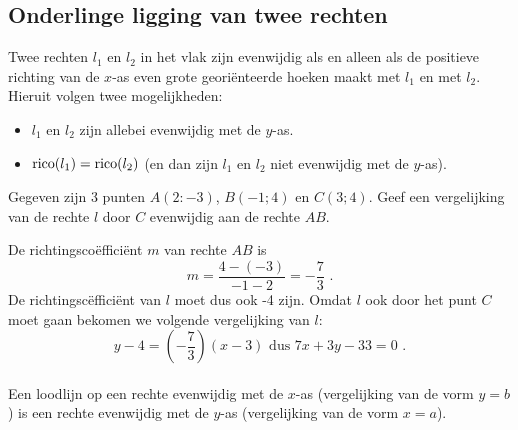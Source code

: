 \subsection{Onderlinge ligging van twee rechten}
\noindent

Twee rechten $l_1$ en $l_2$ in het vlak zijn evenwijdig als en alleen als de positieve richting van de $x$-as even grote geori\"enteerde hoeken maakt met $l_1$ en met $l_2$.
Hieruit volgen twee mogelijkheden:
\begin{itemize}
\item $l_1$ en $l_2$ zijn allebei evenwijdig met de $y$-as.
\item $\operatorname{rico} (l_1)=\operatorname{rico} (l_2)$ (en dan zijn $l_1$ en $l_2$ niet evenwijdig met de $y$-as).
\end{itemize}



\begin{voorbeeld}
Gegeven zijn 3 punten $A(2:-3)$, $B(-1;4)$ en $C(3;4)$.
Geef een vergelijking van de rechte $l$ door $C$ evenwijdig aan de rechte $AB$.


De richtingsco\"effici\"ent $m$ van rechte $AB$ is
\[
m=\frac {4-(-3)}{-1-2}=-\frac {7}{3} \text { .}
\]
De richtingsc\"effici\"ent van $l$ moet dus ook -4 zijn.
Omdat $l$ ook door het punt $C$ moet gaan bekomen we volgende vergelijking van $l$:
\[
y-4=(-\frac {7}{3})(x-3) \text { dus } 7x+3y-33=0 \text { .}
\]\\

Een loodlijn op een rechte evenwijdig met de $x$-as (vergelijking van de vorm $y=b$) is een rechte evenwijdig met de $y$-as (vergelijking van de vorm $x=a$).
\end{voorbeeld}

